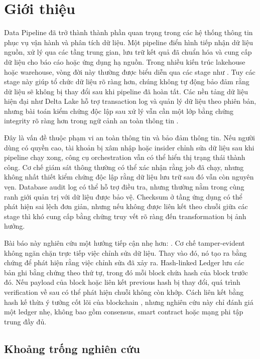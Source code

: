\section{Giới thiệu}

Data Pipeline đã trở thành thành phần quan trọng trong các hệ thống thông tin phục vụ vận hành và phân tích dữ liệu. Một pipeline điển hình tiếp nhận dữ liệu nguồn, xử lý qua các tầng trung gian, lưu trữ kết quả đã chuẩn hóa và cung cấp dữ liệu cho báo cáo hoặc ứng dụng hạ nguồn. Trong nhiều kiến trúc lakehouse hoặc warehouse, vòng đời này thường được biểu diễn qua các stage như \pipeline. Tuy các stage này giúp tổ chức dữ liệu rõ ràng hơn, chúng không tự động bảo đảm rằng dữ liệu sẽ không bị thay đổi sau khi pipeline đã hoàn tất. Các nền tảng dữ liệu hiện đại như Delta Lake hỗ trợ transaction log và quản lý dữ liệu theo phiên bản, nhưng bài toán kiểm chứng độc lập sau xử lý vẫn cần một lớp bằng chứng integrity rõ ràng hơn trong ngữ cảnh an toàn thông tin \cite{databricksDelta,iso27001}.

Đây là vấn đề thuộc phạm vi an toàn thông tin và bảo đảm thông tin. Nếu người dùng có quyền cao, tài khoản bị xâm nhập hoặc insider chỉnh sửa dữ liệu sau khi pipeline chạy xong, công cụ orchestration vẫn có thể hiển thị trạng thái thành công. Cơ chế giám sát thông thường có thể xác nhận rằng job đã chạy, nhưng không nhất thiết kiểm chứng độc lập rằng dữ liệu lưu trữ sau đó vẫn còn nguyên vẹn. Database audit log có thể hỗ trợ điều tra, nhưng thường nằm trong cùng ranh giới quản trị với dữ liệu được bảo vệ. Checksum ở tầng ứng dụng có thể phát hiện sai lệch đơn giản, nhưng nếu không được liên kết theo chuỗi giữa các stage thì khó cung cấp bằng chứng truy vết rõ ràng đến transformation bị ảnh hưởng.

Bài báo này nghiên cứu một hướng tiếp cận nhẹ hơn: \hashledger{}. Cơ chế tamper-evident không ngăn chặn trực tiếp việc chỉnh sửa dữ liệu. Thay vào đó, nó tạo ra bằng chứng để phát hiện rằng việc chỉnh sửa đã xảy ra. Hash-linked Ledger lưu các bản ghi bằng chứng theo thứ tự, trong đó mỗi block chứa hash của block trước đó. Nếu payload của block hoặc liên kết previous hash bị thay đổi, quá trình verification về sau có thể phát hiện chuỗi không còn khớp. Cách liên kết bằng hash kế thừa ý tưởng cốt lõi của blockchain \cite{nakamoto2008bitcoin}, nhưng nghiên cứu này chỉ đánh giá một ledger nhẹ, không bao gồm consensus, smart contract hoặc mạng phi tập trung đầy đủ.

\subsection{Khoảng trống nghiên cứu}


